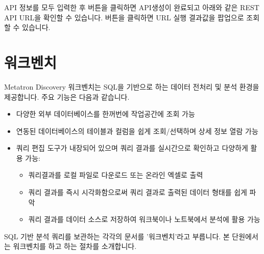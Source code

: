 \documentclass[letterpaper,10pt,english]{sphinxmanual}
\begin{document}
API 정보를 모두 입력한 후  버튼을 클릭하면 API생성이 완료되고 아래와 같은 REST API URL을 확인할 수 있습니다.  버튼을 클릭하면 URL 실행 결과값을 팝업으로 조회할 수 있습니다.
\begin{quote}

\begin{figure}[H]
\centering

\noindent{}
\end{figure}
\end{quote}


\chapter{워크벤치}
\label{\detokenize{discovery/part06/index:id1}}\label{\detokenize{discovery/part06/index::doc}}
\begin{figure}[H]
\centering

\noindent{}
\end{figure}

Metatron Discovery 워크벤치는 SQL을 기반으로 하는 데이터 전처리 및 분석 환경을 제공합니다. 주요 기능은 다음과 같습니다.
\begin{itemize}
\item {} 
다양한 외부 데이터베이스를 한꺼번에 작업공간에 조회 가능

\item {} 
연동된 데이터베이스의 테이블과 컬럼을 쉽게 조회/선택하며 상세 정보 열람 가능

\item {} 
쿼리 편집 도구가 내장되어 있으며 쿼리 결과를 실시간으로 확인하고 다양하게 활용 가능:
\begin{itemize}
\item {} 
쿼리결과를 로컬 파일로 다운로드 또는 온라인 엑셀로 출력

\item {} 
쿼리 결과를 즉시 시각화함으로써 쿼리 결과로 출력된 데이터 형태를 쉽게 파악

\item {} 
쿼리 결과를 데이터 소스로 저장하여 워크북이나 노트북에서 분석에 활용 가능

\end{itemize}

\end{itemize}

SQL 기반 분석 쿼리를 보관하는 각각의 문서를 '워크벤치'라고 부릅니다. 본 단원에서는 워크벤치를 하고 하는 절차를 소개합니다.
\end{document}
